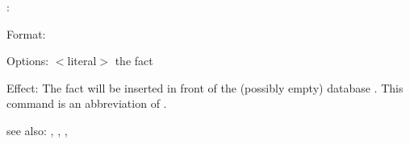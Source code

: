 :

Format: 

Options: $<$literal$>$ the fact

Effect: The fact  will be inserted in front of the (possibly empty) 
	database . 
	This command is an abbreviation of .

see also: , \consult, \destroy, \replace

